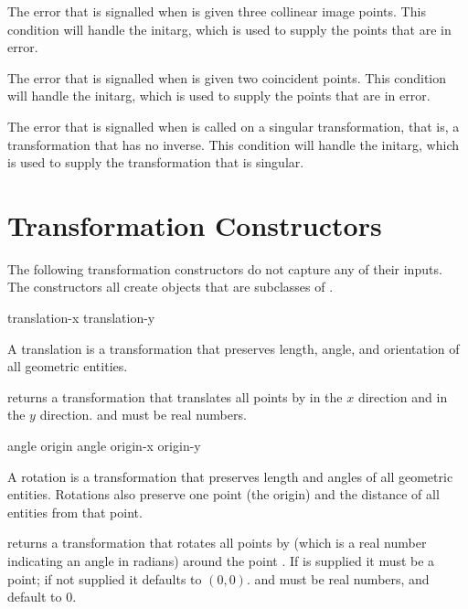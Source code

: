 The error that is signalled when  is given three
collinear image points.  This condition will handle the  initarg,
which is used to supply the points that are in error.


The error that is signalled when  is given
two coincident points.  This condition will handle the  initarg,
which is used to supply the points that are in error.


The error that is signalled when  is called on a
singular transformation, that is, a transformation that has no inverse.  This
condition will handle the  initarg, which is used to supply
the transformation that is singular.


\section {Transformation Constructors}

The following transformation constructors do not capture any of their inputs.
The constructors all create objects that are subclasses of .

 {translation-x translation-y} 

A translation is a transformation that preserves length, angle, and orientation
of all geometric entities.

 returns a transformation that translates
all points by  in the $x$ direction and 
in the $y$ direction.   and  must be real
numbers.


  {angle \optional origin}
 {angle \optional origin-x origin-y}

A rotation is a transformation that preserves length and angles of all geometric
entities.  Rotations also preserve one point (the origin) and the distance of
all entities from that point.

 returns a transformation that rotates all
points by  (which is a real number indicating an angle in radians)
around the point .  If  is supplied it must be a point;
if not supplied it defaults to $(0,0)$.   and  must
be real numbers, and default to $0$.

